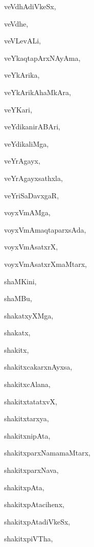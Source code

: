 \begin{multicols}{2}
{veVdhAdiVkeSx}, \pageref{veVdhAdiVkeSx}

{veVdhe}, \pageref{veVdhe}

{veVLevALi}, \pageref{veVLevALi}

{veYkaqtapArxNAyAma}, \pageref{veYkaqtapArxNAyAma}

{veYkArika}, \pageref{veYkArika}

{veYkArikAhaMkAra}, \pageref{veYkArikAhaMkAra}

{veYKari}, \pageref{veYKari}

{veYdikanirABAri}, \pageref{veYdikanirABAri}

{veYdikaliMga}, \pageref{veYdikaliMga}

{veYrAgayx}, \pageref{veYrAgayx}

{veYrAgayxsathxla}, \pageref{veYrAgayxsathxla}

{veYriSaDavxgaR}, \pageref{veYriSaDavxgaR}

{voyxVmAMga}, \pageref{voyxVmAMga}

{voyxVmAmaqtaparxsAda}, \pageref{voyxVmAmaqtaparxsAda}

{voyxVmAsatxrX}, \pageref{voyxVmAsatxrX}

{voyxVmAsatxrXmaMtarx}, \pageref{voyxVmAsatxrXmaMtarx}

{shaMKini}, \pageref{shaMKini}

{shaMBu}, \pageref{shaMBu}

{shakatxyXMga}, \pageref{shakatxyXMga}

{shakatx}, \pageref{shakatx}

{shakitx}, \pageref{shakitx}

{shakitxcakarxnAyxsa}, \pageref{shakitxcakarxnAyxsa}

{shakitxcAlana}, \pageref{shakitxcAlana}

{shakitxtatatxvX}, \pageref{shakitxtatatxvX}

{shakitxtarxya}, \pageref{shakitxtarxya}

{shakitxnipAta}, \pageref{shakitxnipAta}

{shakitxparxNamamaMtarx}, \pageref{shakitxparxNamamaMtarx}

{shakitxparxNava}, \pageref{shakitxparxNava}

{shakitxpAta}, \pageref{shakitxpAta}

{shakitxpAtacihenx}, \pageref{shakitxpAtacihenx}

{shakitxpAtadiVkeSx}, \pageref{shakitxpAtadiVkeSx}

{shakitxpiVTha}, \pageref{shakitxpiVTha}


\end{multicols}
